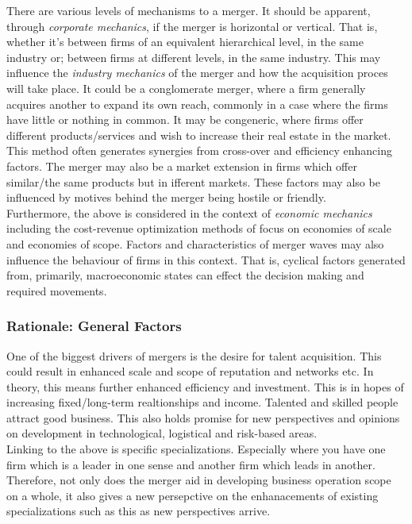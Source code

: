 \documentclass[11pt, english]{article}
\begin{document}
	There are various levels of mechanisms to a merger. It should be apparent, through \textit{corporate mechanics}, if the merger is horizontal or vertical. That is, whether it's between firms of an equivalent hierarchical level, in the same industry or; between firms at different levels, in the same industry. This may influence the \textit{industry mechanics} of the merger and how the acquisition proces will take place. It could be a conglomerate merger, where a firm generally acquires another to expand its own reach, commonly in a case where the firms have little or nothing in common. It may be congeneric, where firms offer different products/services and wish to increase their real estate in the market. This method often generates synergies from cross-over and efficiency enhancing factors. The merger may also be a market extension in firms which offer similar/the same products but in ifferent markets. These factors may also be influenced by motives behind the merger being hostile or friendly.\\

	Furthermore, the above is considered in the context of \textit{economic mechanics} including the cost-revenue optimization methods of focus on economies of scale and economies of scope. Factors and characteristics of merger waves may also influence the behaviour of firms in this context. That is, cyclical factors generated from, primarily, macroeconomic states can effect the decision making and required movements.

		\subsubsection*{Rationale: General Factors}

	One of the biggest drivers of mergers is the desire for talent acquisition. This could result in enhanced scale and scope of reputation and networks etc. In theory, this means further enhanced efficiency and investment. This is in hopes of increasing fixed/long-term realtionships and income. Talented and skilled people attract good business. This also holds promise for new perspectives and opinions on development in technological, logistical and risk-based areas.\\

	Linking to the above is specific specializations. Especially where you have one firm which is a leader in one sense and another firm which leads in another. Therefore, not only does the merger aid in developing business operation scope on a whole, it also gives a new persepctive on the enhanacements of existing specializations such as this as new perspectives arrive.\\
\end{document}
